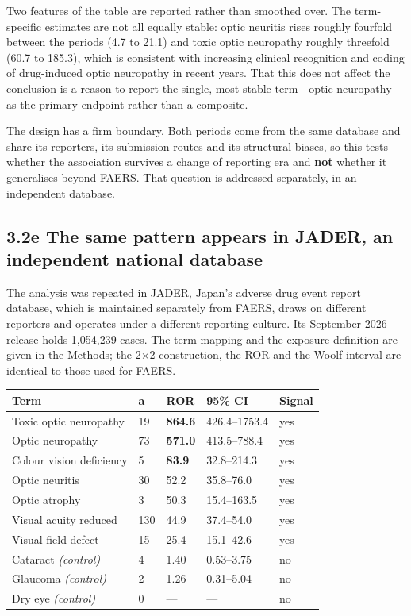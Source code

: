 \documentclass[utf8]{FrontiersinVancouver}
\begin{document}
Two features of the table are reported rather than smoothed over. The term-specific estimates are not all equally stable: optic neuritis rises roughly fourfold between the periods (4.7 to 21.1) and toxic optic neuropathy roughly threefold (60.7 to 185.3), which is consistent with increasing clinical recognition and coding of drug-induced optic neuropathy in recent years. That this does not affect the conclusion is a reason to report the single, most stable term - optic neuropathy - as the primary endpoint rather than a composite.

The design has a firm boundary. Both periods come from the same database and share its reporters, its submission routes and its structural biases, so this tests whether the association survives a change of reporting era and \textbf{not} whether it generalises beyond FAERS. That question is addressed separately, in an independent database.

\subsection{3.2e The same pattern appears in JADER, an independent national database}

The analysis was repeated in JADER, Japan's adverse drug event report database, which is maintained separately from FAERS, draws on different reporters and operates under a different reporting culture. Its September 2026 release holds 1,054,239 cases. The term mapping and the exposure definition are given in the Methods; the 2$\times$2 construction, the ROR and the Woolf interval are identical to those used for FAERS.

\begin{table}[htbp]
\centering
\begin{tabular}{lllll}
\hline
Term & a & ROR & 95\% CI & Signal \\
\hline
Toxic optic neuropathy & 19 & \textbf{864.6} & 426.4--1753.4 & yes \\
Optic neuropathy & 73 & \textbf{571.0} & 413.5--788.4 & yes \\
Colour vision deficiency & 5 & \textbf{83.9} & 32.8--214.3 & yes \\
Optic neuritis & 30 & 52.2 & 35.8--76.0 & yes \\
Optic atrophy & 3 & 50.3 & 15.4--163.5 & yes \\
Visual acuity reduced & 130 & 44.9 & 37.4--54.0 & yes \\
Visual field defect & 15 & 25.4 & 15.1--42.6 & yes \\
Cataract \textit{(control)} & 4 & 1.40 & 0.53--3.75 & no \\
Glaucoma \textit{(control)} & 2 & 1.26 & 0.31--5.04 & no \\
Dry eye \textit{(control)} & 0 & --- & --- & no \\
\hline
\end{tabular}
\end{table}
\end{document}
